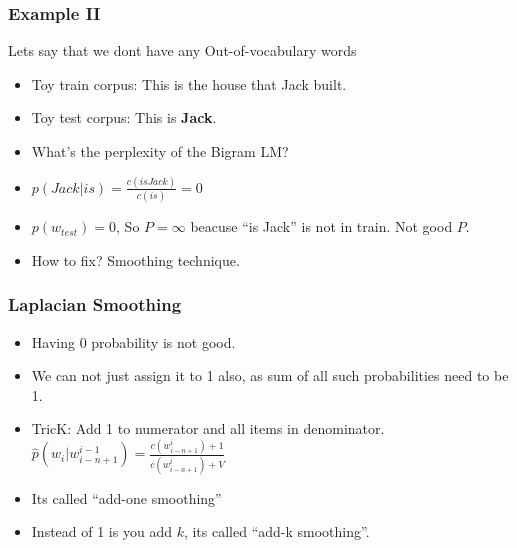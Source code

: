 \begin{frame}[fragile]
  \frametitle{Example II}
  Lets say that we dont have any Out-of-vocabulary words
  \begin{itemize}
  \item Toy train corpus:
This is the house that Jack built.
  \item Toy test corpus:
This is \textbf{Jack}.
  \item What’s the perplexity of the Bigram LM?
  \item  $p(Jack | is) = \frac{c(is Jack)}{c(is)} = 0$
  \item $p(w_{test}) = 0$, So $P = \infty$ beacuse ``is Jack'' is not in train. Not good $P$.
  \item How to fix? Smoothing technique.
  	  \end{itemize}
  	  
 \end{frame} 
 
\begin{frame}[fragile]
  \frametitle{Laplacian Smoothing}

  \begin{itemize}
  \item Having 0 probability is not good. 
  	\item We can not just assign it to 1 also, as sum of all such probabilities need to be 1.
  	\item TricK: Add 1 to numerator and all items in denominator.
  	$\hat{p}(w_i | w^{i-1}_{i-n+1}) = \frac{c(w^i_{i-n+1}) + 1}{c(w^i_{i-n+1}) + V}$
  	\item Its called ``add-one smoothing''
  	\item Instead of 1 is you add $k$, its called ``add-k smoothing''.
  	  \end{itemize}
  	  
 \end{frame} 


